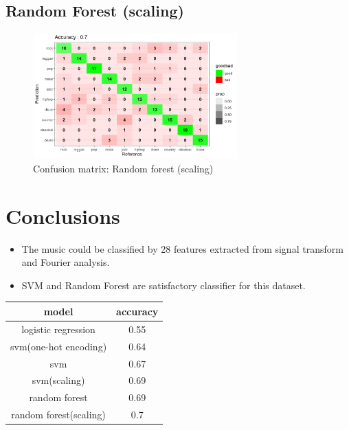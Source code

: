 \documentclass[12pt,a4paper]{article}
\begin{document}
\subsection{Random Forest (scaling)}
\begin{figure}[h]
    \begin{center}
        \includegraphics[width=0.7\textwidth]{confusionMatrix_randomforest_std.png}
    \end{center}
    \caption{Confusion matrix: Random forest (scaling)}
\end{figure}
\newpage
\section{Conclusions}
\begin{itemize}
  \item The music could be classified by 28 features extracted from signal transform and Fourier analysis.
  \item SVM and Random Forest are satisfactory classifier for this dataset.
\end{itemize}
\begin{center}
\begin{tabular}{ |c|c| } 
\hline
 model & accuracy \\ 
\hline
 logistic regression & 0.55 \\ 
 \hline\hline
 svm(one-hot encoding) & 0.64 \\ 
 \hline
 svm & 0.67 \\ 
 \hline
 svm(scaling) & 0.69 \\ 
 \hline\hline
 random forest & 0.69 \\ 
 \hline
 random forest(scaling) & 0.7 \\ 
 \hline
\end{tabular}
\end{center}

\newpage

\end{document}
